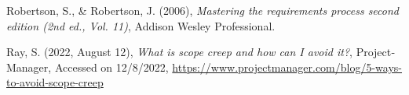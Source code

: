 {\begin{latin}
\begin{thebibliography}{9}
	Robertson, S., \& Robertson, J. (2006),
	\textit{Mastering the requirements process second edition (2nd ed., Vol. 11)},
	Addison Wesley Professional. 

	Ray, S. (2022, August 12),
	\textit{What is scope creep and how can I avoid it?},
	ProjectManager,
	Accessed on 12/8/2022,
	\url{https://www.projectmanager.com/blog/5-ways-to-avoid-scope-creep}

\end{thebibliography}
\endgroup
\end{latin}

}
\newpage
